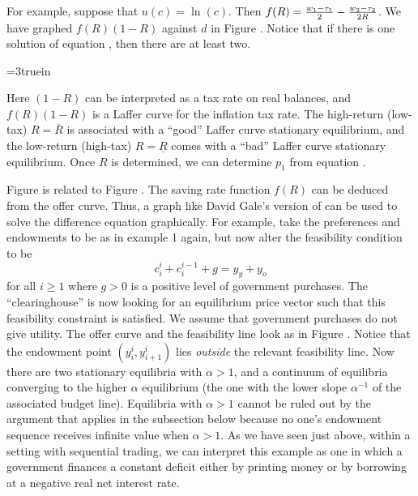 For example, suppose that $u(c) = \ln(c)$.  Then
$ f(R) = {w_1 - \tau_1 \over 2} - {w_2 - \tau_2 \over 2 R}$.  We
have graphed $f(R)(1-R)$ against $d$ in Figure . %
Notice that if there is one solution of equation ,  then there
are at least two.


\centerline{\epsfxsize=3truein}
\caption{The Laffer curve in revenues from the inflation tax.}
\endfigure

  Here $(1-R)$ can be interpreted as  a tax rate on  real
balances, and $f(R)(1-R)$ is a Laffer curve for the inflation
tax rate.  The high-return (low-tax) $R = \overline R$
 is associated with
a ``good'' Laffer curve stationary equilibrium, and
the low-return (high-tax) $R = \underline R$ comes with a ``bad''
Laffer curve stationary
equilibrium.  Once $R$ is determined, we can determine
$p_1$ from equation .

Figure  %
is related to Figure . %
  The saving rate function
$f(R)$ can be deduced from the offer curve. Thus, a graph like David Gale's version of
 can be used to solve the difference equation 
graphically. 
For example, 
%
 take the preferences and endowments
to be as in example 1 again, but now alter the feasibility
condition to be
$$ c^i_i  + c^{i-1}_i + g = y_y + y_o $$
for all $i \geq 1$ where $g > 0$ is a positive level of government
purchases. The ``clearinghouse'' is now looking for an equilibrium
price vector such that this feasibility constraint is satisfied.
We assume that government purchases do not
give utility.
 The offer curve and the feasibility line look
as   in Figure . %
 Notice that the endowment point $(y^i_i, y^i_{i+1})$
lies {\it outside} the relevant feasibility line.
Now there are two stationary equilibria with $\alpha > 1$, and
a continuum of equilibria converging to the higher $\alpha$ equilibrium
(the one with the lower slope $\alpha^{-1}$ of the associated budget line).
Equilibria with $\alpha >1$ cannot be ruled out
by the argument that applies in the  subsection   below  because no one's endowment sequence
receives infinite value when $\alpha >1$.
%
As we have seen just above, within a  setting with sequential trading, we  can interpret
 this example as one in which a government
finances a constant deficit either by printing  money  or by
borrowing at a negative real net interest rate. 


